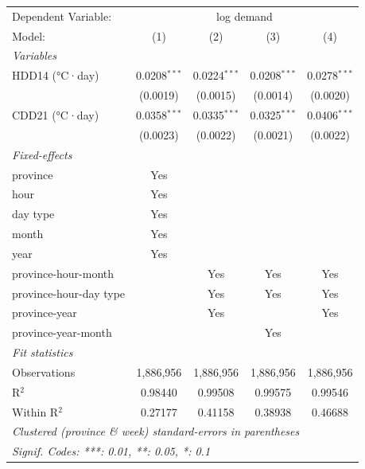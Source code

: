 
\begingroup
\centering
\begin{tabular}{lcccc}
   \tabularnewline \midrule \midrule
   Dependent Variable: & \multicolumn{4}{c}{log demand}\\
   Model:                 & (1)            & (2)            & (3)            & (4)\\  
   \midrule
   \emph{Variables}\\
   HDD14 (°C·day)         & 0.0208$^{***}$ & 0.0224$^{***}$ & 0.0208$^{***}$ & 0.0278$^{***}$\\   
                          & (0.0019)       & (0.0015)       & (0.0014)       & (0.0020)\\   
   CDD21 (°C·day)         & 0.0358$^{***}$ & 0.0335$^{***}$ & 0.0325$^{***}$ & 0.0406$^{***}$\\   
                          & (0.0023)       & (0.0022)       & (0.0021)       & (0.0022)\\   
   \midrule
   \emph{Fixed-effects}\\
   province               & Yes            &                &                & \\  
   hour                   & Yes            &                &                & \\  
   day type               & Yes            &                &                & \\  
   month                  & Yes            &                &                & \\  
   year                   & Yes            &                &                & \\  
   province-hour-month    &                & Yes            & Yes            & Yes\\  
   province-hour-day type &                & Yes            & Yes            & Yes\\  
   province-year          &                & Yes            &                & Yes\\  
   province-year-month    &                &                & Yes            & \\  
   \midrule
   \emph{Fit statistics}\\
   Observations           & 1,886,956      & 1,886,956      & 1,886,956      & 1,886,956\\  
   R$^2$                  & 0.98440        & 0.99508        & 0.99575        & 0.99546\\  
   Within R$^2$           & 0.27177        & 0.41158        & 0.38938        & 0.46688\\  
   \midrule \midrule
   \multicolumn{5}{l}{\emph{Clustered (province \& week) standard-errors in parentheses}}\\
   \multicolumn{5}{l}{\emph{Signif. Codes: ***: 0.01, **: 0.05, *: 0.1}}\\
\end{tabular}
\par\endgroup


